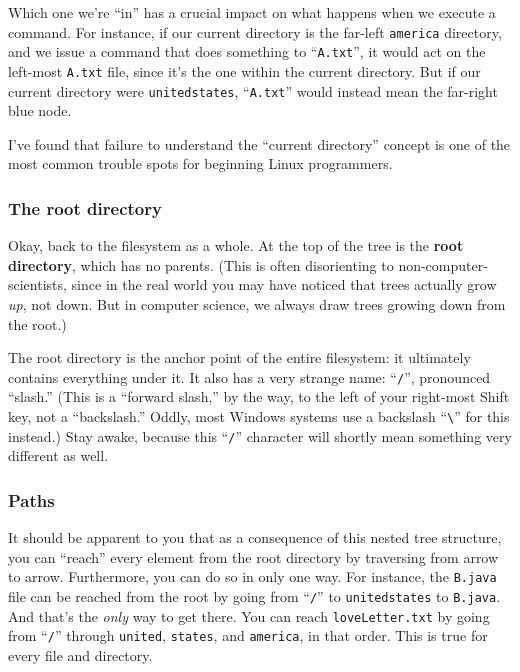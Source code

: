 Which one we're ``in'' has a crucial impact on what happens when we execute a
command. For instance, if our current directory is the far-left
\texttt{america} directory, and we issue a command that does something to
``\texttt{A.txt}'', it would act on the left-most \texttt{A.txt} file, since
it's the one within the current directory. But if our current directory were
\texttt{unitedstates}, ``\texttt{A.txt}'' would instead mean the far-right blue
node.

I've found that failure to understand the ``current directory'' concept is one
of the most common trouble spots for beginning Linux programmers.

\subsubsection{The root directory}


Okay, back to the filesystem as a whole. At the top of the tree is the
\textbf{root directory}, which has no parents. (This is often disorienting to
non-computer-scientists, since in the real world you may have noticed that
trees actually grow \textit{up}, not down. But in computer science, we always
draw trees growing down from the root.)

The root directory is the anchor point of the entire filesystem: it ultimately
contains everything under it. It also has a very strange name: ``\texttt{/}'',
pronounced ``slash.'' (This is a ``forward slash,'' by the way, to the left of
your right-most Shift key, not a ``backslash.'' Oddly, most Windows systems
use a backslash ``\texttt{\textbackslash}'' for this instead.) Stay awake,
because this ``\texttt{/}'' character will shortly mean something very
different as well.

\subsubsection{Paths}

It should be apparent to you that as a consequence of this nested tree
structure, you can ``reach'' every element from the root directory by
traversing from arrow to arrow. Furthermore, you can do so in only one way.
For instance, the \texttt{B.java} file can be reached from the root by going
from ``\texttt{/}'' to \texttt{unitedstates} to \texttt{B.java}. And that's the
\textit{only} way to get there. You can reach \texttt{loveLetter.txt} by going
from ``\texttt{/}'' through \texttt{united}, \texttt{states}, and
\texttt{america}, in that order. This is true for every file and directory.

